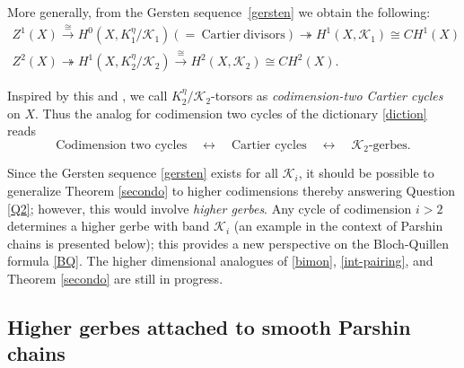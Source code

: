 \documentclass{amsart}
\numberwithin{equation}{subsection}
\theoremstyle{remark}
\theoremstyle{remark}
\newcommand{\too}{\longrightarrow}%
\newcommand{\cK}{\mathcal{K}}
\newcommand{\iso}{\cong}
\begin{document}
More generally, from the Gersten sequence~\eqref{gersten} we obtain the following:
\begin{gather*}
  Z^1(X) \overset{\iso}{\too} H^0(X, K_1^{\eta}/\cK_1) (=~\mathrm{Cartier~divisors}) \twoheadrightarrow H^1(X,\cK_1) \iso
  CH^1(X) \\
  Z^2(X) \twoheadrightarrow H^1(X, K_2^{\eta}/\cK_2) \overset{\iso}{\too} H^2(X,\cK_2) \iso CH^2(X) .
\end{gather*}

Inspired by this and \cite[Definition 3.2]{Bloch}, we call $K_2^{\eta}/\cK_2$-torsors as \emph{codimension-two Cartier cycles} on $X$. Thus the analog for codimension two cycles of the dictionary \eqref{diction} reads
\begin{equation*}
  \text{Codimension two cycles}\quad \longleftrightarrow \quad \text{Cartier~cycles}\quad \longleftrightarrow \quad\text{$\cK_2$-gerbes}.
\end{equation*}

Since the Gersten sequence \eqref{gersten} exists for all $\cK_i$, it  should be possible to generalize Theorem \ref{secondo} to higher codimensions thereby answering Question \ref{Q2}; however, this would involve \textit{higher gerbes}. Any cycle of codimension $i>2$ determines a higher gerbe \cite{Breen94} with band $\cK_i$ (an example in the context of Parshin chains is presented below); this provides a new perspective on the Bloch-Quillen formula \eqref{BQ}. The higher dimensional analogues of  \eqref{bimon}, \eqref{int-pairing}, and Theorem \ref{secondo} are still in progress. 
\subsection*{Higher gerbes attached to smooth Parshin chains}%
\end{document}
